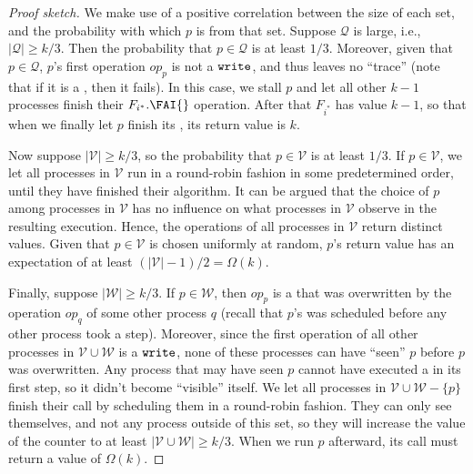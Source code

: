 \documentclass[11pt,letterpaper]{article}
\newcommand{\xwrite}{\text{\tt write}\xspace}
\newcommand{\SC}{\text{\tt SC}\xspace}
\newcommand{\QQ}{\mathcal{Q}}
\newcommand{\VV}{\mathcal{V}}
\newcommand{\WW}{\mathcal{W}}
\newcommand{\op}{\ensuremath{\mathit{op}}}
\begin{document}
\begin{proof}[Proof sketch]
We make use of a positive correlation between the size of each set, and the probability with which $p$ is from that set.
Suppose $\QQ$ is large, i.e., $|\QQ|\geq k/3$.
Then the probability that $p\in\QQ$ is at least $1/3$.
Moreover, given that $p\in\QQ$, $p$'s first operation $\op_p$ is not a $\xwrite$, and thus leaves no ``trace'' (note that if it is a \SC, then it fails).
In this case, we stall $p$ and let all other $k-1$ processes finish their $F_{i^\ast}.\FAI{}$ operation.
After that $F_{i^\ast}$ has value $k-1$, so that when we finally let $p$ finish its \FAI{}, its return value is $k$.

Now suppose $|\VV|\geq k/3$, so the probability that $p\in\VV$ is at least $1/3$.
If $p\in\VV$, we let all processes in $\VV$ run in a round-robin fashion in some predetermined order, until they have finished their algorithm.
It can be argued that the choice of $p$ among processes in $\VV$ has no influence on what processes in $\VV$ observe in the resulting execution.
Hence, the \FAI{} operations of all processes in $\VV$ return distinct values.
Given that $p\in\VV$ is chosen uniformly at random, $p$'s \FAI{} return value has an expectation of at least $(|\VV|-1)/2=\Omega(k)$.

Finally, suppose $|\WW|\geq k/3$.
If $p\in\WW$, then $\op_p$ is a \xwrite that was overwritten by the operation $\op_q$ of some other process $q$ (recall that $p$'s \xwrite was scheduled before any other process took a step).
Moreover, since the first operation of all other processes in $\VV\cup\WW$ is a $\xwrite$, none of these processes can have ``seen'' $p$ before $p$ was overwritten.
Any process that may have seen $p$ cannot have executed a \xwrite in its first step, so it didn't become ``visible'' itself.
We let all processes in $\VV\cup\WW-\{p\}$ finish their \FAI call by scheduling them in a round-robin fashion.
They can only see themselves, and not any process outside of this set, so they will increase the value of the counter to at least $|\VV\cup\WW|\geq k/3$.
When we run $p$ afterward, its \FAI{} call must return a value of $\Omega(k)$.
\end{proof}
\end{document}
